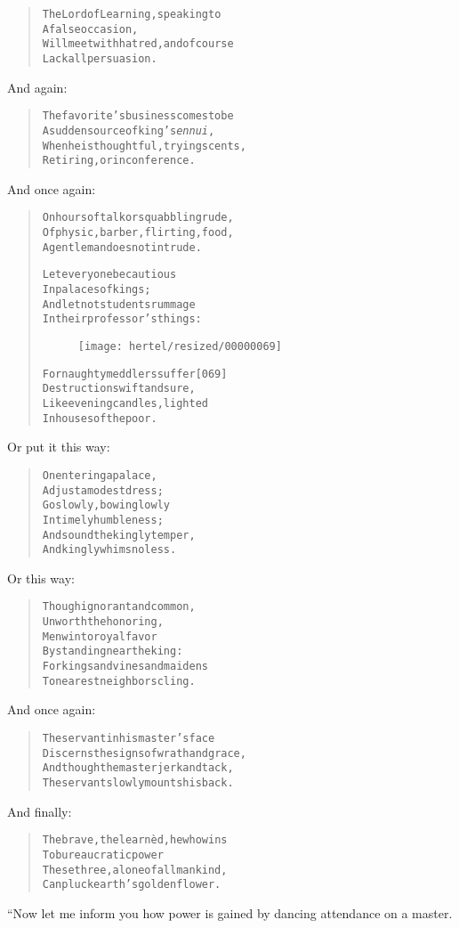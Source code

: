 \documentclass[article, twoside, 10pt]{memoir}
\renewenvironment{verbatim}{%
\begin{quote}%
\vskip -10pt%
\begin{alltt}\normalfont\small}{\end{alltt}%
\end{quote}%
\vskip -10pt
} %
\begin{document}
\begin{verbatim}
The Lord of Learning, speaking to
    A false occasion,
Will meet with hatred, and of course
    Lack all persuasion.
\end{verbatim}
And again:

\begin{verbatim}
The favorite's business comes to be
A sudden source of king's \emph{ennui},
When he is thoughtful, trying scents,
Retiring, or in conference.
\end{verbatim}
And once again:

\begin{verbatim}
On hours of talk or squabbling rude,
Of physic, barber, flirting, food,
A gentleman does not intrude.

Let everyone be cautious
    In palaces of kings;
And let not students rummage
    In their professor's things:
\begin{figure}[p]\texttt{[image: hertel/resized/00000069]}\end{figure}For naughty meddlers suffer                             [069]
    Destruction swift and sure,
Like evening candles, lighted
    In houses of the poor.
\end{verbatim}
Or put it this way:

\begin{verbatim}
On entering a palace,
    Adjust a modest dress;
Go slowly, bowing lowly
    In timely humbleness;
And sound the kingly temper,
    And kingly whims no less.
\end{verbatim}
Or this way:

\begin{verbatim}
Though ignorant and common,
    Unworth the honoring,
Men win to royal favor
    By standing near the king:
For kings and vines and maidens
    To nearest neighbors cling.
\end{verbatim}
And once again:

\begin{verbatim}
The servant in his master's face
Discerns the signs of wrath and grace,
And though the master jerk and tack,
The servant slowly mounts his back.
\end{verbatim}
And finally:

\begin{verbatim}
The brave, the learnèd, he who wins
    To bureaucratic power
These three, alone of all mankind,
    Can pluck earth's golden flower.
\end{verbatim}
“Now let me inform you how power is gained by dancing attendance on
a master.
\end{document}
